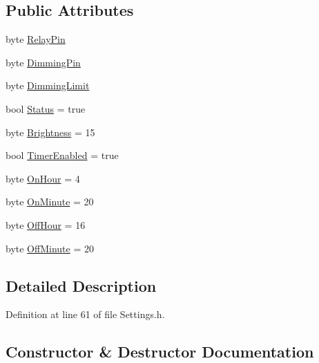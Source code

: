\subsection*{Public Attributes}
\begin{DoxyCompactItemize}
\item 
byte \hyperlink{struct_settings_1_1_lights_settings_a673a594b02bf5274e1abc73de1576fbc}{Relay\+Pin}
\item 
byte \hyperlink{struct_settings_1_1_lights_settings_a648257fa9fd042a9864268c00edd6e9d}{Dimming\+Pin}
\item 
byte \hyperlink{struct_settings_1_1_lights_settings_a6ea62bb9bdea85117c8dec9fb6ef98c8}{Dimming\+Limit}
\item 
bool \hyperlink{struct_settings_1_1_lights_settings_ae71c9b08249612f3ff26599004d189e6}{Status} = true
\item 
byte \hyperlink{struct_settings_1_1_lights_settings_a41f736a9f233324844386e49779dbfb6}{Brightness} = 15
\item 
bool \hyperlink{struct_settings_1_1_lights_settings_a4ef1e968d6946baa04bceefaba3f66d3}{Timer\+Enabled} = true
\item 
byte \hyperlink{struct_settings_1_1_lights_settings_ab60dccdddbf9028d6eec5c06a5a9aa2d}{On\+Hour} = 4
\item 
byte \hyperlink{struct_settings_1_1_lights_settings_a045c1594bfe34a681999ef96d6813161}{On\+Minute} = 20
\item 
byte \hyperlink{struct_settings_1_1_lights_settings_a83de3e2d6ce9d3db100a78e44190f393}{Off\+Hour} = 16
\item 
byte \hyperlink{struct_settings_1_1_lights_settings_a3a854118bda9b2718b90fafb592559a3}{Off\+Minute} = 20
\end{DoxyCompactItemize}


\subsection{Detailed Description}


Definition at line 61 of file Settings.\+h.



\subsection{Constructor \& Destructor Documentation}
\mbox{\label{struct_settings_1_1_lights_settings_a1544965041d8368ad0303a91689314af}} 

